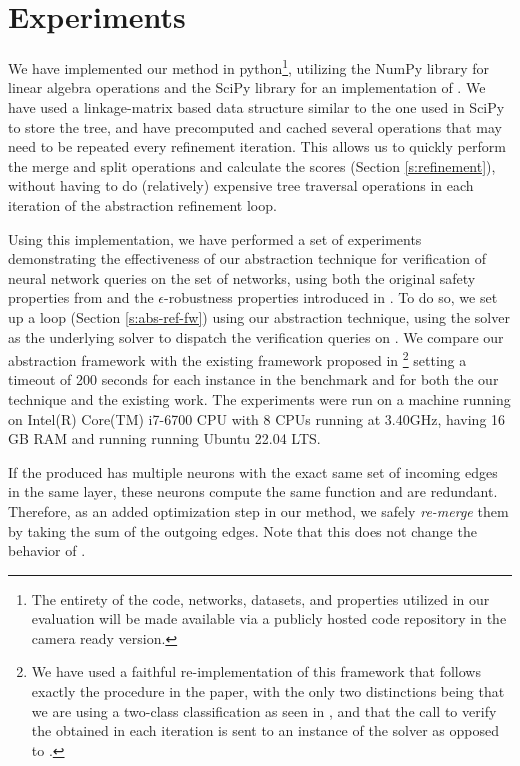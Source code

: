 \section{Experiments} 

We have implemented our method in python\footnote{The entirety of the code,
networks, datasets, and properties utilized in our evaluation will be made
available via a publicly hosted code repository in the camera ready version.}, 
utilizing the NumPy library for linear algebra
operations and the SciPy library for an implementation of \hcluster.
We have used a linkage-matrix based data structure similar to the one used in
SciPy to store the tree, and have precomputed and cached several
operations that may need to be repeated every refinement iteration. This allows
us to quickly perform the merge and split operations and calculate the
scores (Section \ref{s:refinement}), without having to do (relatively)
expensive tree traversal operations in each iteration of the abstraction
refinement loop. 

Using this implementation, we have performed a set of experiments demonstrating
the effectiveness of our abstraction technique for verification of neural
network queries on the \acasxu set of networks, using both the original safety
properties from \cite{reluplex} and the $\epsilon$-robustness properties
introduced in \cite{cegar-nn}. To do so, we set up a \cegar loop (Section
\ref{s:abs-ref-fw}) using our abstraction technique, using the \neuralsat solver
as the underlying solver to dispatch the verification queries on \abs.
We compare our abstraction framework with the existing \cegar framework proposed
in \cite{cegar-nn} \footnote{We have used a faithful re-implementation of this
framework that follows exactly the procedure in the paper, with the only two
distinctions being that we are using a two-class classification as seen in
\cite{chauhan2022efficiently,liu2022abstraction,10.1145/3644387},
and that the call to verify the \abs obtained in each iteration is sent to an
instance of the \neuralsat solver as opposed to \marabou. } 
setting a 
timeout of 200 seconds for each instance in the benchmark and for both the
our technique and the existing work.
The experiments were run on a machine running on Intel(R) Core(TM) 
i7-6700 CPU with 8 CPUs running at 3.40GHz, having 16 GB RAM and running running 
Ubuntu 22.04 LTS.

If the \abs produced has multiple neurons with the exact same set of incoming
edges in the same layer, these neurons compute the same function and are
redundant. Therefore, as an added optimization step in our method, 
we safely \textit{re-merge}
them by taking the sum of the outgoing edges. Note that this does not change the
behavior of \abs.

